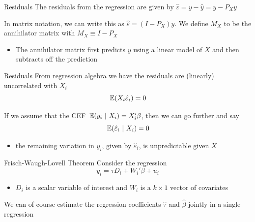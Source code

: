 \documentclass[aspectratio=169,t,11pt,table]{beamer}
\begin{document}
\begin{frame}{Residuals}
  The residuals from the regression are given by $\hat{\varepsilon} = y - \hat{y} = y - P_X y$

  \bigskip
  In matrix notation, we can write this as $\hat{\varepsilon} = (I - P_X) y$. We define $M_X$ to be the \alert{annihilator matrix} with $M_X \equiv I - P_X$

  \pause
  \begin{itemize}
    \item The annihilator matrix first predicts $y$ using a linear model of $X$ and then subtracts off the prediction
  \end{itemize}
\end{frame}

\begin{frame}{Residuals}
  From regression algebra we have the residuals are (linearly) uncorrelated with $X_i$ 
  $$
    \expec{X_i \hat{\varepsilon}_i} = 0
  $$
  
  \bigskip
  \pause 
  If we assume that the CEF $\expec{y_i}{X_i} = X_i' \beta$, then we can go further and say 
  $$
    \expec{\hat{\varepsilon}_i}{X_i} = 0
  $$
  \begin{itemize}
    \item the remaining variation in $y_i$, given by $\hat{\varepsilon}_i$, is unpredictable given $X$
  \end{itemize}
\end{frame}


\begin{frame}{Frisch-Waugh-Lovell Theorem}
  Consider the regression
  $$
    y_i = \tau D_i + W_i' \beta + u_i
  $$
  \begin{itemize}
    \item $D_i$ is a scalar variable of interest and $W_i$ is a $k \times 1$ vector of covariates
  \end{itemize}

  \bigskip
  We can of course estimate the regression coefficients $\hat{\tau}$ and $\hat{\beta}$ jointly in a single regression
\end{frame}
\end{document}
